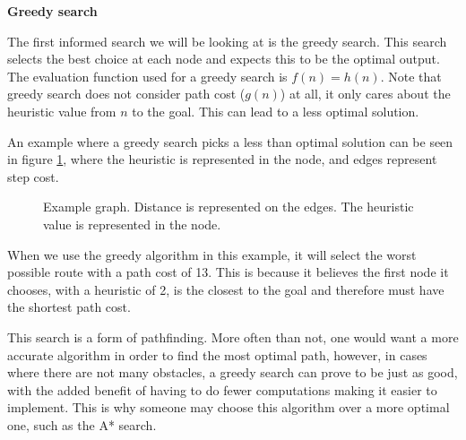 \documentclass[]{final_report}
\begin{document}
\textbf{Greedy search}

The first informed search we will be looking at is the greedy search. This search selects the best choice at each node and expects this to be the optimal output. The evaluation function used for a greedy search is $f(n) = h(n)$. Note that greedy search does not consider path cost ($g(n)$) at all, it only cares about the heuristic value from $n$ to the goal. This can lead to a less optimal solution. 

An example where a greedy search picks a less than optimal solution can be seen in figure \ref{fig: heuristic graph}, where the heuristic is represented in the node, and edges represent step cost.

\begin{figure}[!h]
\centering
{} 
\caption{Example graph. Distance is represented on the edges. The heuristic value is represented in the node.}
\label{fig: heuristic graph}
\end{figure}

When we use the greedy algorithm in this example, it will select the worst possible route with a path cost of 13. This is because it believes the first node it chooses, with a heuristic of 2, is the closest to the goal and therefore must have the shortest path cost. 

This search is a form of pathfinding. More often than not, one would want a more accurate algorithm in order to find the most optimal path, however, in cases where there are not many obstacles, a greedy search can prove to be just as good, with the added benefit of having to do fewer computations making it easier to implement. This is why someone may choose this algorithm over a more optimal one, such as the A* search.
\end{document}
